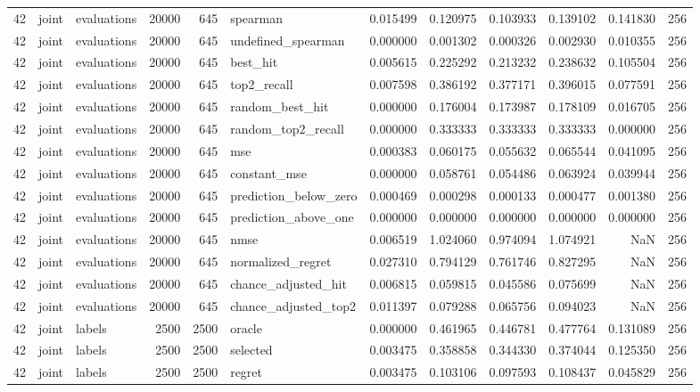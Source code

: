 \begin{tabular}{rllrrlrrrrrr}
42 & joint & evaluations & 20000 & 645 & spearman & 0.015499 & 0.120975 & 0.103933 & 0.139102 & 0.141830 & 256 \\
42 & joint & evaluations & 20000 & 645 & undefined_spearman & 0.000000 & 0.001302 & 0.000326 & 0.002930 & 0.010355 & 256 \\
42 & joint & evaluations & 20000 & 645 & best_hit & 0.005615 & 0.225292 & 0.213232 & 0.238632 & 0.105504 & 256 \\
42 & joint & evaluations & 20000 & 645 & top2_recall & 0.007598 & 0.386192 & 0.377171 & 0.396015 & 0.077591 & 256 \\
42 & joint & evaluations & 20000 & 645 & random_best_hit & 0.000000 & 0.176004 & 0.173987 & 0.178109 & 0.016705 & 256 \\
42 & joint & evaluations & 20000 & 645 & random_top2_recall & 0.000000 & 0.333333 & 0.333333 & 0.333333 & 0.000000 & 256 \\
42 & joint & evaluations & 20000 & 645 & mse & 0.000383 & 0.060175 & 0.055632 & 0.065544 & 0.041095 & 256 \\
42 & joint & evaluations & 20000 & 645 & constant_mse & 0.000000 & 0.058761 & 0.054486 & 0.063924 & 0.039944 & 256 \\
42 & joint & evaluations & 20000 & 645 & prediction_below_zero & 0.000469 & 0.000298 & 0.000133 & 0.000477 & 0.001380 & 256 \\
42 & joint & evaluations & 20000 & 645 & prediction_above_one & 0.000000 & 0.000000 & 0.000000 & 0.000000 & 0.000000 & 256 \\
42 & joint & evaluations & 20000 & 645 & nmse & 0.006519 & 1.024060 & 0.974094 & 1.074921 & NaN & 256 \\
42 & joint & evaluations & 20000 & 645 & normalized_regret & 0.027310 & 0.794129 & 0.761746 & 0.827295 & NaN & 256 \\
42 & joint & evaluations & 20000 & 645 & chance_adjusted_hit & 0.006815 & 0.059815 & 0.045586 & 0.075699 & NaN & 256 \\
42 & joint & evaluations & 20000 & 645 & chance_adjusted_top2 & 0.011397 & 0.079288 & 0.065756 & 0.094023 & NaN & 256 \\
42 & joint & labels & 2500 & 2500 & oracle & 0.000000 & 0.461965 & 0.446781 & 0.477764 & 0.131089 & 256 \\
42 & joint & labels & 2500 & 2500 & selected & 0.003475 & 0.358858 & 0.344330 & 0.374044 & 0.125350 & 256 \\
42 & joint & labels & 2500 & 2500 & regret & 0.003475 & 0.103106 & 0.097593 & 0.108437 & 0.045829 & 256 \\

\end{tabular}
